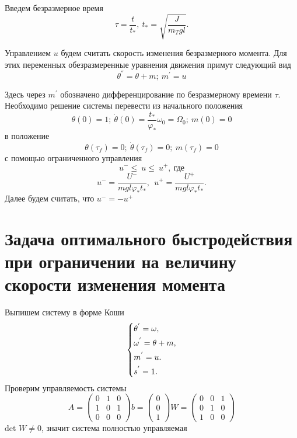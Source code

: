 \documentclass[a4paper,14pt]{article}
\theoremstyle{plain} %
\theoremstyle{definition} %
\theoremstyle{remark} %
\begin{document}
{Введем безразмерное время
\[
    \tau=\frac{t}{t_\ast},\ t_\ast=\sqrt{\frac{J}{m_Tgl}}.
\]

Управлением $u$ будем считать скорость изменения безразмерного
момента. Для этих переменных обезразмеренные уравнения движения
примут следующий вид
\[
    \theta^{''}=\theta+m;\ m^{'}=u
\]

Здесь через $m^{'}$ обозначено дифференцирование по
безразмерному времени $\tau$. Необходимо решение системы
перевести из начального положения
\begin{equation}\label{9}
    \theta(0)=1;\ \dot{\theta}(0)=\frac{t_\ast}{\varphi_\ast}\omega_0=\Omega_0;\ m(0)=0
\end{equation}
в положение
\begin{equation}\label{9}
    \theta(\tau_f)=0;\ \dot{\theta}(\tau_f)=0;\ m(\tau_f)=0
\end{equation}
с помощью ограниченного управления
\[
    u^-\le\ u\le\ u^+,\ \text{где}
\]
\[
    u^-=\frac{U^-}{mgl\varphi_\ast t_\ast},\ \ u^+=\frac{U^+}{mgl\varphi_\ast t_\ast}.
\]
Далее будем считать, что $u^-=-u^+$
\newpage
\section{Задача оптимального быстродействия при ограничении на величину скорости изменения момента}
Выпишем систему в форме Коши
\begin{equation}\label{koshisystem}
    \left\{ {\begin{aligned}
                 & \theta^{'} = \omega , \hfill   \\
                 & \omega^{'} = \theta+m , \hfill \\
                 & m^{'} = u . \hfill             \\
                 & s^{'} = 1 . \hfill             \\
            \end{aligned}} \right.
\end{equation}
Проверим управляемость системы
\begin{equation*}
    A =
    \begin{pmatrix}
        0 & 1 & 0 \\
        1 & 0 & 1 \\
        0 & 0 & 0
    \end{pmatrix}
    b =
    \begin{pmatrix}
        0 \\
        0 \\
        1
    \end{pmatrix}
    W =
    \begin{pmatrix}
        0 & 0 & 1 \\
        0 & 1 & 0 \\
        1 & 0 & 0
    \end{pmatrix}
\end{equation*}
det $W\neq0$, значит система полностью управляемая

}
\end{document}
